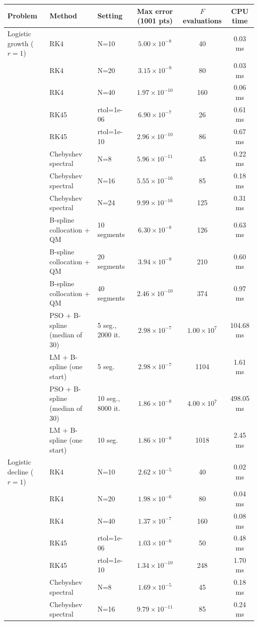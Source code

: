 \begin{tabular}{lllccc}
\toprule
Problem & Method & Setting & Max error (1001 pts) & $F$ evaluations & CPU time\\
\midrule
Logistic growth ($r=1$) & RK4 & N=10 & $5.00\times10^{-8}$ & 40 & 0.03 ms\\
 & RK4 & N=20 & $3.15\times10^{-9}$ & 80 & 0.03 ms\\
 & RK4 & N=40 & $1.97\times10^{-10}$ & 160 & 0.06 ms\\
 & RK45 & rtol=1e-06 & $6.90\times10^{-7}$ & 26 & 0.61 ms\\
 & RK45 & rtol=1e-10 & $2.96\times10^{-10}$ & 86 & 0.67 ms\\
 & Chebyshev spectral & N=8 & $5.96\times10^{-11}$ & 45 & 0.22 ms\\
 & Chebyshev spectral & N=16 & $5.55\times10^{-16}$ & 85 & 0.18 ms\\
 & Chebyshev spectral & N=24 & $9.99\times10^{-16}$ & 125 & 0.31 ms\\
 & B-spline collocation + QM & 10 segments & $6.30\times10^{-8}$ & 126 & 0.63 ms\\
 & B-spline collocation + QM & 20 segments & $3.94\times10^{-9}$ & 210 & 0.60 ms\\
 & B-spline collocation + QM & 40 segments & $2.46\times10^{-10}$ & 374 & 0.97 ms\\
 & PSO + B-spline (median of 30) & 5 seg., 2000 it. & $2.98\times10^{-7}$ & $1.00\times10^{7}$ & 104.68 ms\\
 & LM + B-spline (one start) & 5 seg. & $2.98\times10^{-7}$ & 1104 & 1.61 ms\\
 & PSO + B-spline (median of 30) & 10 seg., 8000 it. & $1.86\times10^{-8}$ & $4.00\times10^{7}$ & 498.05 ms\\
 & LM + B-spline (one start) & 10 seg. & $1.86\times10^{-8}$ & 1018 & 2.45 ms\\
\addlinespace
Logistic decline ($r=1$) & RK4 & N=10 & $2.62\times10^{-5}$ & 40 & 0.02 ms\\
 & RK4 & N=20 & $1.98\times10^{-6}$ & 80 & 0.04 ms\\
 & RK4 & N=40 & $1.37\times10^{-7}$ & 160 & 0.08 ms\\
 & RK45 & rtol=1e-06 & $1.03\times10^{-6}$ & 50 & 0.48 ms\\
 & RK45 & rtol=1e-10 & $1.34\times10^{-10}$ & 248 & 1.70 ms\\
 & Chebyshev spectral & N=8 & $1.69\times10^{-5}$ & 45 & 0.18 ms\\
 & Chebyshev spectral & N=16 & $9.79\times10^{-11}$ & 85 & 0.24 ms\\

\end{tabular}
